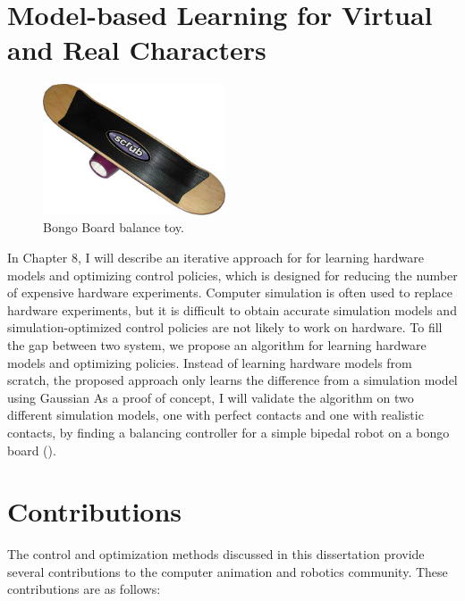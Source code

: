 \section{Model-based Learning for Virtual and Real Characters}
\begin{figure}
 \vspace{-10pt}
  \begin{center}
    \includegraphics[width=0.48\textwidth]{images/intro_bongo.jpg}
  \end{center}
   \vspace{-25pt}
  \caption{Bongo Board balance toy.}
  \label{fig:intro_bongo}
   \vspace{-10pt}
\end{figure}

In Chapter 8, I will describe an iterative approach for for learning 
hardware models and optimizing control policies, which is designed for
reducing the number of expensive hardware experiments.
Computer simulation is often used to replace hardware experiments,
but it is difficult to obtain accurate simulation models and
simulation-optimized control policies are not likely to work on hardware.
To fill the gap between two system, we propose an algorithm for learning
hardware models and optimizing policies. 
Instead of learning hardware models from scratch, the proposed approach only
learns the difference from a simulation model using Gaussian 
As a proof of concept, I will validate the algorithm on two different 
simulation models, one with perfect contacts and one with realistic contacts,
by finding a balancing controller for a simple bipedal robot on a bongo board
().

\section{Contributions}
The control and optimization methods discussed in this dissertation provide
several contributions to the computer animation and robotics community. 
These contributions are as follows:

